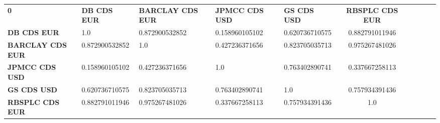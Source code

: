 \begin{tabular}{|l|l|l|l|l|c|c|c|c|c|}
\hline
\textbf{0} & \textbf{DB CDS EUR} & \textbf{BARCLAY CDS EUR} & \textbf{JPMCC CDS USD} & \textbf{GS CDS USD} & \textbf{RBSPLC CDS EUR}\\\hhline{|=|=|=|=|=|=|}
\textbf{DB CDS EUR} & 1.0 & 0.872900532852 & 0.158960105102 & 0.620736710575 & 0.882791011946\\
\textbf{BARCLAY CDS EUR} & 0.872900532852 & 1.0 & 0.427236371656 & 0.823705035713 & 0.975267481026\\
\textbf{JPMCC CDS USD} & 0.158960105102 & 0.427236371656 & 1.0 & 0.763402890741 & 0.337667258113\\
\textbf{GS CDS USD} & 0.620736710575 & 0.823705035713 & 0.763402890741 & 1.0 & 0.757934391436\\
\textbf{RBSPLC CDS EUR} & 0.882791011946 & 0.975267481026 & 0.337667258113 & 0.757934391436 & 1.0\\
\hline
\end{tabular}
